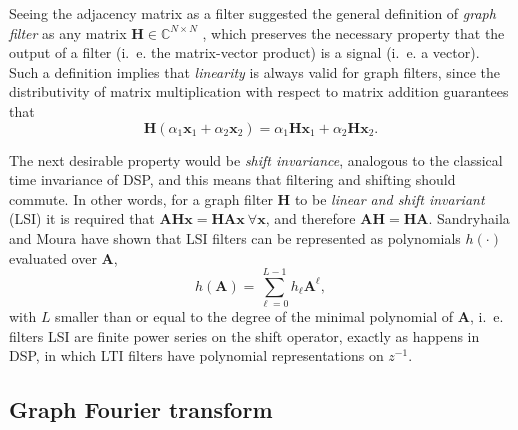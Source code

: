 Seeing the adjacency matrix as a filter suggested the general definition of \emph{graph filter} as any matrix $ \mathbf{H} \in \mathbb{C}^{N \times N} $ \cite{sandryhaila2013filters}, which preserves the necessary property that the output of a filter (i.~e. the matrix-vector product) is a signal (i.~e. a vector). Such a definition implies that \emph{linearity} is always valid for graph filters, since the distributivity of matrix multiplication with respect to matrix addition guarantees that
\begin{equation}
\mathbf{H} (\alpha_1 \mathbf{x}_1 + \alpha_2 \mathbf{x}_2) =  \alpha_1 \mathbf{H} \mathbf{x}_1 + \alpha_2 \mathbf{H}  \mathbf{x}_2.
\end{equation}

The next desirable property would be \emph{shift invariance}, analogous to the classical time invariance of DSP, and this means that filtering and shifting should commute. In other words, for a graph filter $ \mathbf{H} $ to be \emph{linear and shift invariant} (LSI) it is required that $ \mathbf{A} \mathbf{H} \mathbf{x} = \mathbf{H} \mathbf{A} \mathbf{x} \ \forall \mathbf{x}$, and therefore $ \mathbf{A} \mathbf{H} = \mathbf{H} \mathbf{A}$. Sandryhaila and Moura have shown \cite{sandryhaila2013discrete,sandryhaila2014big} that LSI filters can be represented as polynomials $ h(\cdot) $ evaluated over $ \mathbf{A} $,
\begin{equation}
\label{eq:filter_poly}
h(\mathbf{A}) = \sum_{\ell=0}^{L-1} h_\ell \mathbf{A}^\ell,
\end{equation}
with $ L $ smaller than or equal to the degree of the minimal polynomial of $ \mathbf{A} $, i.~e. filters LSI are finite power series on the shift operator, exactly as happens in DSP, in which LTI filters have polynomial representations on $ z^{-1} $.


\subsection{Graph Fourier transform}

